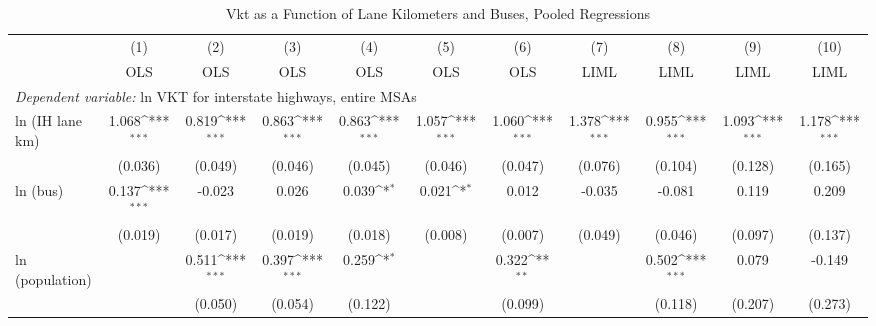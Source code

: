           \begin{table}[htbp]\centering         {}         \caption{Vkt as a Function of Lane Kilometers and Buses, Pooled Regressions}         \begin{tabular}{l*{10}{c}}         \hline\hline                 
                    &\multicolumn{1}{c}{(1)}&\multicolumn{1}{c}{(2)}&\multicolumn{1}{c}{(3)}&\multicolumn{1}{c}{(4)}&\multicolumn{1}{c}{(5)}&\multicolumn{1}{c}{(6)}&\multicolumn{1}{c}{(7)}&\multicolumn{1}{c}{(8)}&\multicolumn{1}{c}{(9)}&\multicolumn{1}{c}{(10)}\\
                    &\multicolumn{1}{c}{OLS}&\multicolumn{1}{c}{OLS}&\multicolumn{1}{c}{OLS}&\multicolumn{1}{c}{OLS}&\multicolumn{1}{c}{OLS}&\multicolumn{1}{c}{OLS}&\multicolumn{1}{c}{LIML}&\multicolumn{1}{c}{LIML}&\multicolumn{1}{c}{LIML}&\multicolumn{1}{c}{LIML}\\
 \hline \multicolumn{10}{l}{ \emph{Dependent variable:} ln VKT for interstate highways, entire MSAs} \\ 
ln (IH lane km)     &       1.068\sym{***}&       0.819\sym{***}&       0.863\sym{***}&       0.863\sym{***}&       1.057\sym{***}&       1.060\sym{***}&       1.378\sym{***}&       0.955\sym{***}&       1.093\sym{***}&       1.178\sym{***}\\
                    &     (0.036)         &     (0.049)         &     (0.046)         &     (0.045)         &     (0.046)         &     (0.047)         &     (0.076)         &     (0.104)         &     (0.128)         &     (0.165)         \\
[1em]
ln (bus)            &       0.137\sym{***}&      -0.023         &       0.026         &       0.039\sym{*}  &       0.021\sym{*}  &       0.012         &      -0.035         &      -0.081         &       0.119         &       0.209         \\
                    &     (0.019)         &     (0.017)         &     (0.019)         &     (0.018)         &     (0.008)         &     (0.007)         &     (0.049)         &     (0.046)         &     (0.097)         &     (0.137)         \\
[1em]
ln (population)     &                     &       0.511\sym{***}&       0.397\sym{***}&       0.259\sym{*}  &                     &       0.322\sym{**} &                     &       0.502\sym{***}&       0.079         &      -0.149         \\
                    &                     &     (0.050)         &     (0.054)         &     (0.122)         &                     &     (0.099)         &                     &     (0.118)         &     (0.207)         &     (0.273)         \\

\end{tabular}
\end{table}
